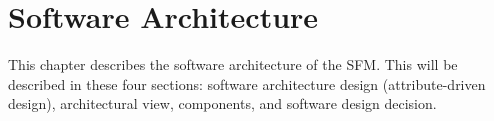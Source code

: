 \chapter{Software Architecture}
\label{ch:software}
This chapter describes the software architecture of the SFM. This will be described in these four sections: software architecture design (attribute-driven design), architectural view, components, and software design decision.





%



